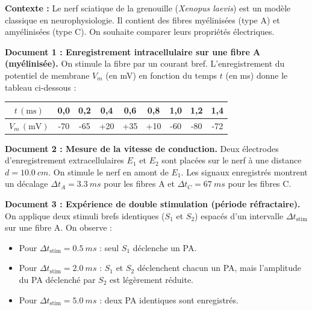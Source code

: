 \documentclass[11pt]{article}
\newcounter{popsec}
\newcounter{popsub}
\newcommand{\courssub}[1]{%
  \stepcounter{popsub}%
  \par\vspace{9pt}\noindent{\popxbold\fontsize{11.5}{13}\selectfont\color{popink}{\color{poporange}\thepopsec.\thepopsub}\hspace{6pt}#1}\par\nopagebreak\vspace{4pt}
}
\begin{document}
\courssub{Je me prépare au Bac}

\begin{exercice}
\textbf{Contexte :} Le nerf sciatique de la grenouille (\emph{Xenopus laevis}) est un modèle classique en neurophysiologie. Il contient des fibres myélinisées (type A) et amyélinisées (type C). On souhaite comparer leurs propriétés électriques.

\textbf{Document 1 : Enregistrement intracellulaire sur une fibre A (myélinisée).}
On stimule la fibre par un courant bref. L'enregistrement du potentiel de membrane $V_m$ (en mV) en fonction du temps $t$ (en ms) donne le tableau ci-dessous :

\begin{center}
\begin{tabular}{|c|c|c|c|c|c|c|c|c|}\hline
\rowcolor{popblueL}
$t\,(\text{ms})$ & 0,0 & 0,2 & 0,4 & 0,6 & 0,8 & 1,0 & 1,2 & 1,4 \\ \hline
$V_m\,(\text{mV})$ & -70 & -65 & +20 & +35 & +10 & -60 & -80 & -72 \\ \hline
\end{tabular}
\end{center}

\textbf{Document 2 : Mesure de la vitesse de conduction.}
Deux électrodes d'enregistrement extracellulaires $E_1$ et $E_2$ sont placées sur le nerf à une distance $d = \SI{10,0}{cm}$. On stimule le nerf en amont de $E_1$. Les signaux enregistrés montrent un décalage $\Delta t_A = \SI{3,3}{ms}$ pour les fibres A et $\Delta t_C = \SI{67}{ms}$ pour les fibres C.

\textbf{Document 3 : Expérience de double stimulation (période réfractaire).}
On applique deux stimuli brefs identiques ($S_1$ et $S_2$) espacés d'un intervalle $\Delta t_{\text{stim}}$ sur une fibre A. On observe :
\begin{itemize}
    \item Pour $\Delta t_{\text{stim}} = \SI{0,5}{ms}$ : seul $S_1$ déclenche un PA.
    \item Pour $\Delta t_{\text{stim}} = \SI{2,0}{ms}$ : $S_1$ et $S_2$ déclenchent chacun un PA, mais l'amplitude du PA déclenché par $S_2$ est légèrement réduite.
    \item Pour $\Delta t_{\text{stim}} = \SI{5,0}{ms}$ : deux PA identiques sont enregistrés.
\end{itemize}


\end{exercice}
\end{document}
